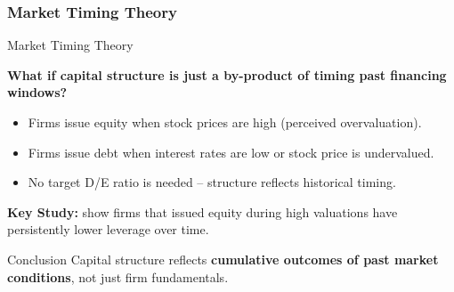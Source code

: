 \subsubsection{Market Timing Theory}
\begin{frame}{Market Timing Theory}
	
	\textbf{What if capital structure is just a by-product of timing past financing windows?}
	
	\begin{itemize}
		\item Firms issue equity when stock prices are high (perceived overvaluation).
		\item Firms issue debt when interest rates are low or stock price is undervalued.
		\item No target D/E ratio is needed -- structure reflects historical timing.
	\end{itemize}
	
	\vspace{0.3cm}
	\textbf{Key Study:}  
	\textcite{baker2002market} show firms that issued equity during high valuations have persistently lower leverage over time.
	
	\vspace{0.3cm}
	\begin{alertblock}{Conclusion}
		Capital structure reflects \textbf{cumulative outcomes of past market conditions}, not just firm fundamentals.
	\end{alertblock}
	
\end{frame}


